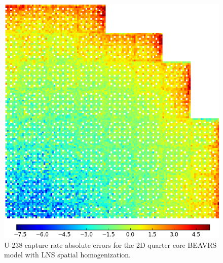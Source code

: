 \begin{figure}[h!]
\centering
\includegraphics[width=\linewidth]{figures/patterns/lns/full-core/capt-err-lns}
\vspace{2mm}
\caption[U-238 capture rate absolute errors for \ac{BEAVRS} with LNS homogenization]{U-238 capture rate absolute errors for the 2D quarter core \ac{BEAVRS} model with \ac{LNS} spatial homogenization.}
\label{fig:chap9-full-core-capt-err-lns}
\end{figure}

\clearpage

